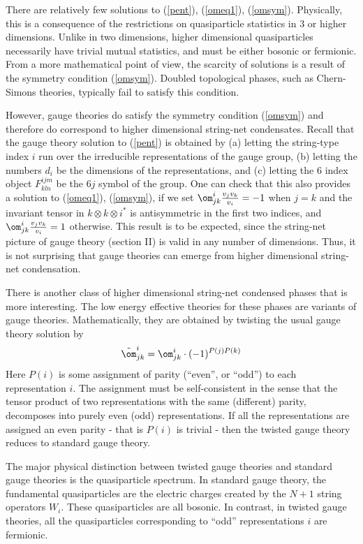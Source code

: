 \documentclass[aps,twocolumn,groupedaddress,showpacs,floatfix]{revtex4}
\def\w{v}
\begin{document}
There are relatively few solutions to (\ref{pent}), (\ref{omeq1}), 
(\ref{omsym}). 
Physically, this is a consequence of the restrictions on quasiparticle 
statistics in $3$ or higher dimensions. Unlike in two dimensions, higher 
dimensional quasiparticles necessarily have trivial mutual statistics, and must
be either bosonic or fermionic. From a more mathematical point of view, the 
scarcity of solutions is a result of the symmetry condition (\ref{omsym}). 
Doubled topological phases, such as Chern-Simons theories, typically fail to 
satisfy this condition. 

However, gauge theories do satisfy the symmetry condition (\ref{omsym}) and
therefore do correspond to higher dimensional string-net condensates.  Recall
that the gauge theory solution to (\ref{pent}) is obtained by  (a) letting the
string-type index $i$ run over the irreducible representations of the gauge
group, (b) letting the numbers $d_i$ be the dimensions of the representations,
and (c) letting the $6$ index object $F^{ijm}_{kln}$ be the $6j$ symbol of the
group. One can check that this also provides a solution to (\ref{omeq1}),
(\ref{omsym}), if we set $\om^{i}_{jk}\frac{\w_j\w_k}{\w_i} = -1$ when $j = k$
and the invariant tensor in $k \otimes k \otimes i^*$ is antisymmetric in 
the first two indices, and $\om^{i}_{jk}\frac{\w_j\w_k}{\w_i} = 1$ 
otherwise.  This result is to be expected, since the string-net picture 
of gauge theory (section II) is valid in any number of dimensions. Thus, 
it is not surprising that gauge theories can emerge from higher 
dimensional string-net condensation.

There is another class of higher dimensional string-net condensed phases
that is more interesting. The low energy effective theories for these
phases are variants of gauge theories. Mathematically, they are obtained by
twisting the usual gauge theory solution by
\begin{equation}
\tilde{\om}^{i}_{jk} = \om^{i}_{jk} \cdot (-1)^{P(j)P(k)}
\end{equation}
Here $P(i)$ is some assignment of parity (``even'', or ``odd'') to 
each representation $i$. The assignment must be self-consistent in the sense 
that the tensor product of two representations with the same (different)
parity, decomposes into purely even (odd) representations. If all the 
representations are assigned an even parity - that is $P(i)$ is trivial - then 
the twisted gauge theory reduces to standard gauge theory.

The major physical distinction between twisted gauge theories and
standard gauge theories is the quasiparticle spectrum. In standard gauge
theory, the fundamental quasiparticles are the electric charges created by
the $N+1$ string operators $W_i$. These quasiparticles are all bosonic. In
contrast, in twisted gauge theories, all the quasiparticles corresponding to
``odd'' representations $i$ are fermionic. 
\end{document}
